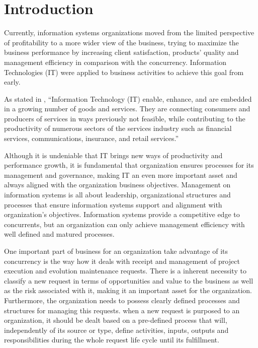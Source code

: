 
% 
% 

\section{Introduction}


Currently, information systems organizations moved from the limited perspective of profitability to a more wider view of the business, trying to maximize the business performance by increasing client satisfaction, products' quality and management efficiency in comparison with the concurrency. Information Technologies (IT) were applied to business activities to achieve this goal from early.\par 
As stated in \cite{itilSS}, ``Information Technology (IT) enable, enhance, and are embedded in a growing number of goods and services. They are connecting consumers and producers of services in ways previously not feasible, while contributing to the productivity of numerous sectors of the services industry such as financial services, communications, insurance, and retail services.''\par
Although it is undeniable that IT brings new ways of productivity and performance growth, it is fundamental that organization ensures processes for its management and governance, making IT an even more important asset and always aligned with the organization business objectives. Management on information systems is all about leadership, organizational structures and processes that ensure information systems support and alignment with organization's objectives. Information systems provide a competitive edge to concurrents, but an organization can only achieve management efficiency with well defined and matured processes.\par
One important part of business for an organization take advantage of its concurrency is the way how it deals with receipt and management of project execution and evolution maintenance requests. There is a inherent necessity to classify a new request in terms of opportunities  and value to the business as well as the risk associated with it, making it an important asset for the organization. Furthermore, the organization needs to possess clearly defined processes and structures for managing this requests. when a new request is purposed to an organization, it should be dealt based on a pre-defined process that will, independently of its source or type, define activities, inputs, outputs and responsibilities during the whole request life cycle until its fulfillment. \par
